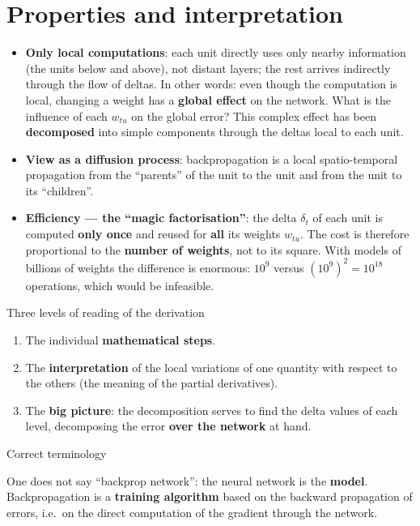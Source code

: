 \section{Properties and
interpretation}\label{proprietuxe0-e-interpretazione}

\begin{itemize}
\tightlist
\item
  \textbf{Only local computations}: each unit directly uses only nearby
  information (the units below and above), not distant layers; the rest
  arrives indirectly through the flow of deltas. In other words: even
  though the computation is local, changing a weight has a
  \textbf{global effect} on the network. What is the influence of each
  \(w_{tu}\) on the global error? This complex effect has been
  \textbf{decomposed} into simple components through the deltas local
  to each unit.
\item
  \textbf{View as a diffusion process}: backpropagation is a local
  spatio-temporal propagation from the ``parents'' of the unit to the
  unit and from the unit to its ``children''.
\item
  \textbf{Efficiency --- the ``magic factorisation''}: the delta
  \(\delta_t\) of each unit is computed \textbf{only once} and reused
  for \textbf{all} its weights \(w_{tu}\). The cost is therefore
  proportional to the \textbf{number of weights}, not to its square.
  With models of billions of weights the difference is enormous:
  \(10^9\) versus \((10^9)^2 = 10^{18}\) operations, which would be
  infeasible.
\end{itemize}

\begin{boxtip}{Three levels of reading of the derivation}

\begin{enumerate}
\def\labelenumi{\arabic{enumi}.}
\tightlist
\item
  The individual \textbf{mathematical steps}.
\item
  The \textbf{interpretation} of the local variations of one quantity
  with respect to the others (the meaning of the partial derivatives).
\item
  The \textbf{big picture}: the decomposition serves to find the delta
  values of each level, decomposing the error \textbf{over the network}
  at hand.
\end{enumerate}

\end{boxtip}

\begin{boxwarning}{Correct terminology}

One does not say ``backprop network'': the neural network is the
\textbf{model}. Backpropagation is a \textbf{training algorithm} based
on the backward propagation of errors, i.e.\ on the direct computation
of the gradient through the network.

\end{boxwarning}

